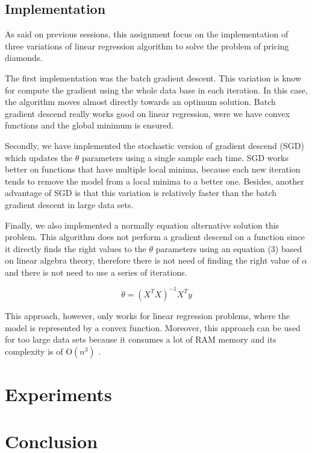 \documentclass[conference]{IEEEtran}
\begin{document}
\subsection{Implementation}
	As said on previous sessions, this assignment focus on the implementation of three variations of linear regression algorithm to solve the problem of pricing diamonds.\par
    The first implementation was the batch gradient descent. This variation is know for compute the gradient using the whole data base in each iteration. In this case, the algorithm moves almost directly towards an optimum solution. Batch gradient descend really works good on linear regression, were we have convex functions and the global minimum is ensured.\par
    Secondly, we have implemented the stochastic version of gradient descend (SGD) which updates the $\theta$ parameters using a single sample each time. SGD works better on functions that have multiple local minima, because each new iteration tends to remove the model from a local minima to a better one. Besides, another advantage of SGD is that this variation is relatively faster than the batch gradient descent in large data sets.\par
    Finally, we also implemented a normally equation alternative solution this problem. This algorithm does not perform a gradient descend on a function since it directly finds the right values to the $\theta$ parameters using an equation (3) based on linear algebra theory, therefore there is not need of finding the right value of $\alpha$ and there is not need to use a series of iterations.\par

\begin{equation}
\theta = (X^T X)^{-1} X^T y
\end{equation}

This approach, however, only works for linear regression problems, where the model is represented by a convex function. Moreover, this approach can be used for too large data sets because it consumes a lot of RAM memory and its complexity is of O\((n^3)\) .\par

\section{Experiments}


\section{Conclusion}
\end{document}
